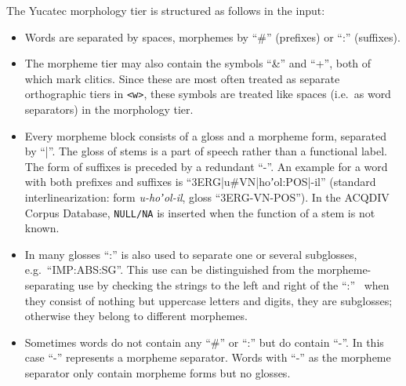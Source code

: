\documentclass[a4paper, 11pt]{book}
\begin{document}
The Yucatec morphology tier is structured as follows in the input: 

\begin{itemize}
	\item Words are separated by spaces, morphemes by “\#” (prefixes) or “:” (suffixes). 
	\item The morpheme tier may also contain the symbols “\&” and “+”, both of which mark clitics. Since these are most often treated as 
		separate orthographic tiers in \texttt{<w>}, these symbols are treated like spaces (i.e.\ as word separators) in the
		morphology tier. 
	\item Every morpheme block consists of a gloss and a morpheme form, separated by “|”. The gloss of stems is a part of speech rather than a 
		functional label. The form of suffixes is preceded by a redundant “-”. An example for a word with both prefixes and suffixes is 
		“3ERG|u\#VN|hoʼol:POS|-il” (standard interlinearization: form \emph{u-hoʼol-il}, gloss “3ERG-VN-POS”). In the ACQDIV Corpus Database, \texttt{NULL/NA}
		is inserted when the function of a stem is not known. 
	\item In many glosses “:” is also used to separate one or several subglosses, e.g.\ “IMP:ABS:SG”. This use can be distinguished 
		from the morpheme-separating use by checking the strings to the left and right of the “:” \textendash\ when they consist 
		of nothing but uppercase letters and digits, they are subglosses; otherwise they belong to different morphemes.
	\item Sometimes words do not contain any “\#” or “:” but do contain “-”. In this case “-” represents a morpheme separator. 
		Words with “-” as the morpheme separator only contain morpheme forms but no glosses. 
\end{itemize}

\end{document}
